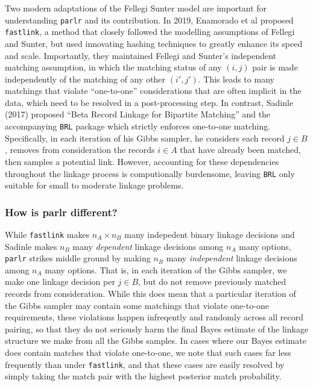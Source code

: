 \documentclass[
  12pt,
]{article}
\begin{document}
Two modern adaptations of the Fellegi Sunter model are important for
understanding \texttt{parlr} and its contribution. In 2019, Enamorado et
al proposed \texttt{fastlink}, a method that closely followed the
modelling assumptions of Fellegi and Sunter, but used innovating hashing
techniques to greatly enhance its speed and scale. Importantly, they
maintained Fellegi and Sunter's independent matching assumption, in
which the matching status of any \((i,j)\) pair is made independently of
the matching of any other \((i', j')\). This leads to many matchings
that violate ``one-to-one'' considerations that are often implicit in
the data, which need to be resolved in a post-processing step. In
contrast, Sadinle (2017) proposed ``Beta Record Linkage for Bipartite
Matching'' and the accompanying \texttt{BRL} package which strictly
enforces one-to-one matching. Specifically, in each iteration of his
Gibbs sampler, he considers each record \(j\in B\), removes from
consideration the records \(i\in A\) that have already been matched,
then samples a potential link. However, accounting for these
dependencies throughout the linkage process is computionally burdensome,
leaving \texttt{BRL} only suitable for small to moderate linkage
problems.

\hypertarget{how-is-parlr-different}{%
\subsubsection{How is parlr different?}\label{how-is-parlr-different}}

While \texttt{fastlink} makes \(n_A \times n_B\) many indepedent binary
linkage decisions and Sadinle makes \(n_B\) many \emph{dependent}
linkage decisions among \(n_A\) many options, \texttt{parlr} strikes
middle ground by making \(n_B\) many \emph{independent} linkage
decisions among \(n_A\) many options. That is, in each iteration of the
Gibbs sampler, we make one linkage decision per \(j \in B\), but do not
remove previously matched records from consideration. While this does
mean that a particular iteration of the Gibbs sampler may contain some
matchings that violate one-to-one requirements, these violations happen
infreqently and randomly across all record pairing, so that they do not
seriously harm the final Bayes estimate of the linkage structure we make
from all the Gibbs samples. In cases where our Bayes estimate does
contain matches that violate one-to-one, we note that such cases far
less frequently than under \texttt{fastlink}, and that these cases are
easily resolved by simply taking the match pair with the highest
posterior match probability.
\end{document}
